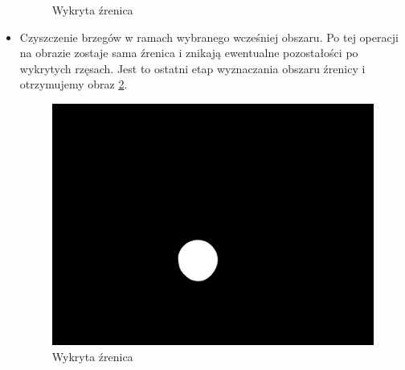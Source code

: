 \begin{itemize}
\begin{figure}
\begin{center}
\caption{Wykryta źrenica}
\label{fig:otwarcie2}
\end{center}
\end{figure}
\item Czyszczenie brzegów w ramach wybranego wcześniej obszaru. Po tej operacji na obrazie zostaje sama źrenica i znikają ewentualne pozostałości po wykrytych rzęsach. Jest to ostatni etap wyznaczania obszaru źrenicy i otrzymujemy obraz \ref{fig:zrenica2}.
\begin{figure}
\begin{center}
\includegraphics[scale=0.5]{zrenica2.jpg}
\caption{Wykryta źrenica}
\label{fig:zrenica2}
\end{center}
\end{figure}
\end{itemize}


